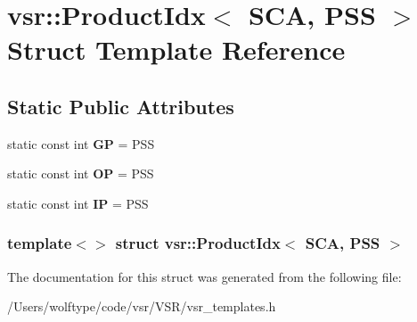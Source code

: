 \hypertarget{structvsr_1_1_product_idx_3_01_s_c_a_00_01_p_s_s_01_4}{\section{vsr\-:\-:Product\-Idx$<$ S\-C\-A, P\-S\-S $>$ Struct Template Reference}
\label{structvsr_1_1_product_idx_3_01_s_c_a_00_01_p_s_s_01_4}
}
\subsection*{Static Public Attributes}
\begin{DoxyCompactItemize}
\item 
\hypertarget{structvsr_1_1_product_idx_3_01_s_c_a_00_01_p_s_s_01_4_a54ab225ff79a444776be624a62d68fa6}{static const int {\bfseries G\-P} = P\-S\-S}\label{structvsr_1_1_product_idx_3_01_s_c_a_00_01_p_s_s_01_4_a54ab225ff79a444776be624a62d68fa6}

\item 
\hypertarget{structvsr_1_1_product_idx_3_01_s_c_a_00_01_p_s_s_01_4_aaa84bcd01c91f9b89badc8b8739c6469}{static const int {\bfseries O\-P} = P\-S\-S}\label{structvsr_1_1_product_idx_3_01_s_c_a_00_01_p_s_s_01_4_aaa84bcd01c91f9b89badc8b8739c6469}

\item 
\hypertarget{structvsr_1_1_product_idx_3_01_s_c_a_00_01_p_s_s_01_4_afafd523f2287e9c3a2dea3fcbba44670}{static const int {\bfseries I\-P} = P\-S\-S}\label{structvsr_1_1_product_idx_3_01_s_c_a_00_01_p_s_s_01_4_afafd523f2287e9c3a2dea3fcbba44670}

\end{DoxyCompactItemize}
\subsubsection*{template$<$$>$ struct vsr\-::\-Product\-Idx$<$ S\-C\-A, P\-S\-S $>$}



The documentation for this struct was generated from the following file\-:\begin{DoxyCompactItemize}
\item 
/\-Users/wolftype/code/vsr/\-V\-S\-R/vsr\-\_\-templates.\-h\end{DoxyCompactItemize}
